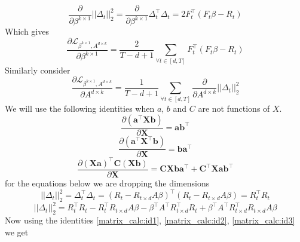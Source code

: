 \begin{equation}
    \frac{\partial}{\partial \beta^{k \times 1}} ||\Delta_t||_2^2 =  \frac{\partial}{\partial \beta^{k \times 1}} \Delta_t^\top \Delta_t = 2F_t^\top (F_t \beta - R_t)
\end{equation}
\newline Which gives
\begin{equation}
    \frac{\partial \mathcal{L}_{\beta^{k \times 1}, A^{d\times k}}}{\partial \beta^{k \times 1}} = \frac{2}{T-d+1} \sum_{\forall t\in [d,T]} F_t^\top (F_t \beta - R_t)
\end{equation}
\newline Similarly consider 
\begin{equation}
    \frac{\partial \mathcal{L}_{\beta^{k \times 1}, A^{d\times k}}}{\partial A^{d \times k}} = \frac{1}{T-d+1} \sum_{\forall t\in [d,T]} \frac{\partial}{\partial A^{d \times k}} ||\Delta_t||_2^2 
\end{equation}
We will use the following identities when $a$, $b$ and $C$ are not functions of $X$.
\begin{equation} \label{matrix_calc:id1}
\frac{\partial (\mathbf{a}^\top \mathbf{X} \mathbf{b})}{\partial \mathbf{X}} = \mathbf{a} \mathbf{b}^\top
\end{equation}
\begin{equation}\label{matrix_calc:id2}
\frac{\partial (\mathbf{a}^\top \mathbf{X}^\top \mathbf{b})}{\partial \mathbf{X}} = \mathbf{b} \mathbf{a}^\top
\end{equation}
\begin{equation}\label{matrix_calc:id3}
\frac{\partial (\mathbf{X} \mathbf{a})^\top \mathbf{C} (\mathbf{X} \mathbf{b})}{\partial \mathbf{X}} = \mathbf{C} \mathbf{X} \mathbf{b} \mathbf{a}^\top + \mathbf{C}^\top \mathbf{X} \mathbf{a} \mathbf{b}^\top
\end{equation}
\newline for the equations below we are dropping the dimensions
\begin{equation}
    ||\Delta_t||_2^2 = \Delta_t^\top \Delta_t = (R_t-R_{t\times d} A  \beta)^\top (R_t-R_{t\times d} A \beta) = R_t^\top R_t
\end{equation}
\begin{equation}
    ||\Delta_t||_2^2 = R_t^\top R_t - R_t^\top R_{t\times d} A \beta - \beta^\top A^\top  R_{t\times d}^\top R_t+ \beta^\top A^\top  R_{t\times d}^\top R_{t\times d} A \beta
\end{equation}
\newline Now using the identities \ref{matrix_calc:id1}, \ref{matrix_calc:id2}, \ref{matrix_calc:id3} we get 
